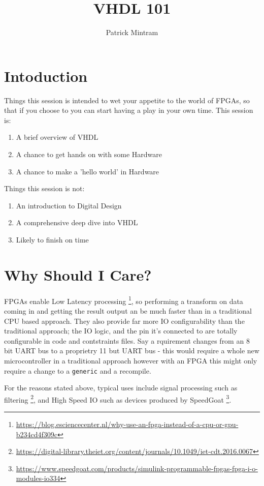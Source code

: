 \documentclass[12pt,a4paper]{article}
\title{VHDL 101}
\author{Patrick Mintram}
\begin{document}
\clearpage\maketitle
\thispagestyle{empty} %
\pagebreak

\section{Intoduction}
Things this session is intended to wet your appetite to the world of FPGAs, so that if you choose to you can start having a play in your own time. This session is:
\begin{enumerate}
    \item A brief overview of VHDL
    \item A chance to get hands on with some Hardware
    \item A chance to make a 'hello world' in Hardware
\end{enumerate}

Things this session is not:
\begin{enumerate}
    \item An introduction to Digital Design
    \item A comprehensive deep dive into VHDL
    \item Likely to finish on time
\end{enumerate}

\pagebreak
\tableofcontents
\listoffigures
\pagebreak

\setlength{\parskip}{1em}

\section{Why Should I Care?}
FPGAs enable Low Latency processing \footnote{\url{https://blog.esciencecenter.nl/why-use-an-fpga-instead-of-a-cpu-or-gpu-b234cd4f309c}}, so performing a transform on data coming in and getting the result output an be much faster than in a traditional CPU based approach. They also provide far more IO configurability than the traditional approach; the IO logic, and the pin it's connected to are totally configurable in code and contstraints files. Say a rquirement changes from an 8 bit UART bus to a proprietry 11 but UART bus - this would require a whole new microcontroller in a traditional approach however with an FPGA this might only require a change to a \texttt{generic} and a recompile. 

For the reasons stated above, typical uses include signal processing such as filtering \footnote{\url{https://digital-library.theiet.org/content/journals/10.1049/iet-cdt.2016.0067}}, and High Speed IO such as devices produced by SpeedGoat \footnote{\url{https://www.speedgoat.com/products/simulink-programmable-fpgas-fpga-i-o-modules-io334}}.
\end{document}
